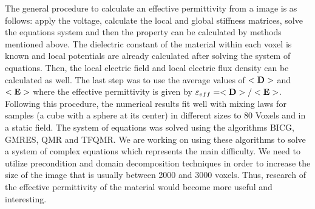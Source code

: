 \documentclass{report}
\begin{document}
The general procedure to calculate an effective permittivity from a image
is as follows: apply the voltage, calculate the local and global
stiffness matrices, solve the equations system and then the property can
be calculated by methods mentioned above. The dielectric constant of the
material within each voxel is known and local potentials are already
calculated after solving the system of equations. Then, the local
electric field and local electric flux density can be calculated as well.
The last step was to use the average values of $<{\bf D}>$ and $<{\bf
E}>$ where the effective permittivity is given by $\varepsilon_{eff} =
<{\bf D}>/<{\bf E}> $. Following this procedure, the numerical results
fit well with mixing laws for samples (a cube with a sphere at its
center) in different sizes to 80 Voxels and in a static field. The system
of equations was solved using the algorithms BICG, GMRES, QMR and TFQMR.
We are working on using these algorithms to solve a system of complex
equations which represents the main difficulty. We need to utilize
precondition and domain decomposition techniques in order to increase the
size of the image that is usually between 2000 and 3000 voxels. Thus,
research of the effective permittivity of the material would become more
useful and interesting.
\end{document}
